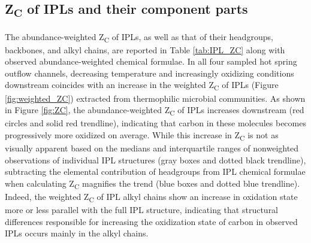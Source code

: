 
\subsection{Z\textsubscript{C} of IPLs and their component parts}
The abundance-weighted Z\textsubscript{C} of IPLs, as well as that of their headgroups, backbones, and alkyl chains, are reported in Table \ref{tab:IPL_ZC} along with observed abundance-weighted chemical formulae. In all four sampled hot spring outflow channels, decreasing temperature and increasingly oxidizing conditions downstream coincides with an increase in the weighted Z\textsubscript{C} of IPLs (Figure \ref{fig:weighted_ZC}) extracted from thermophilic microbial communities. As shown in Figure \ref{fig:ZC}, the abundance-weighted Z\textsubscript{C} of IPLs increases downstream (red circles and solid red trendline), indicating that carbon in these molecules becomes progressively more oxidized on average. While this increase in Z\textsubscript{C} is not as visually apparent based on the medians and interquartile ranges of nonweighted observations of individual IPL structures (gray boxes and dotted black trendline), subtracting the elemental contribution of headgroups from IPL chemical formulae when calculating Z\textsubscript{C} magnifies the trend (blue boxes and dotted blue trendline). Indeed, the weighted Z\textsubscript{C} of IPL alkyl chains show an increase in oxidation state more or less parallel with the full IPL structure, indicating that structural differences responsible for increasing the oxidization state of carbon in observed IPLs occurs mainly in the alkyl chains.


